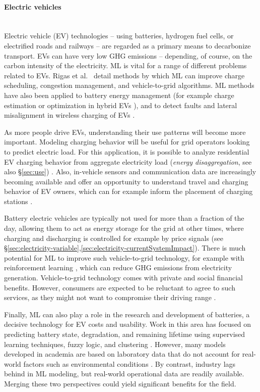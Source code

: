 \documentclass[11pt]{report}
\newcommand{\Gap}{\texorpdfstring{\hfill}{}}
\newcommand{\Rec}{\texorpdfstring{{\small\emph{\color{blue}{\fbox{High Leverage}}}}}{}}
\begin{document}
\paragraph*{Electric vehicles}\Gap\textbf{\Rec}\mbox{}\\\label{sec:transport-evs}Electric vehicle (EV) technologies -- using batteries, hydrogen fuel cells, or electrified roads and railways -- are regarded as a primary means to decarbonize transport. EVs can have very low GHG emissions -- depending, of course, on the carbon intensity of the electricity. ML is vital for a range of different problems related to EVs. Rigas et al.~\cite{7000557} detail methods by which ML can improve charge scheduling, congestion management, and vehicle-to-grid algorithms. ML methods have also been applied to battery energy management (for example charge estimation \cite{HANSEN2005351} or optimization in hybrid EVs \cite{en11030476}), and to detect faults and lateral misalignment in wireless charging of EVs \cite{8096493}. 

As more people drive EVs, understanding their use patterns will become more important. Modeling charging behavior will be useful for grid operators looking to predict electric load. For this application, it is possible to analyze residential EV charging behavior from aggregate electricity load (\emph{energy disaggregation}, see also \S\ref{sec:use}) \cite{WANG20192611}. Also, in-vehicle sensors and communication data are increasingly becoming available and offer an opportunity to understand travel and charging behavior of EV owners, which can for example inform the placement of charging stations \cite{TAO2018735}. 

Battery electric vehicles are typically not used for more than a fraction of the day, allowing them to act as energy storage for the grid 
at other times, where charging and discharging is controlled for example by price signals \cite{doi:10.1002/wene.56} (see \S\ref{sec:electricity-variable},\ref{sec:electricity-currentSystemImpact}). There is much potential for ML to improve such vehicle-to-grid technology, for example with reinforcement learning \cite{VAZQUEZCANTELI20191072}, which can reduce GHG emissions from electricity generation. Vehicle-to-grid technology comes with private and social financial benefits. However, consumers are expected to be reluctant to agree to such services, as they might not want to compromise their driving range \cite{HIDRUE201567}. 

Finally, ML can also play a role in the research and development of batteries, a decisive technology for EV costs and usability. 
Work in this area has focused on predicting battery state, degradation, and remaining lifetime using supervised learning techniques, fuzzy logic, and clustering \cite{wu2016review, waag2014critical, si2011remaining, severson2019data, ellis2018new, hu2016advanced, kauwe2019data, buteau2019}.
However, many models developed in academia are based on laboratory data that do not account for real-world factors such as environmental conditions \cite{wu2016review, waag2014critical, si2011remaining}. By contrast, industry lags behind in ML modeling, but real-world operational data are readily available. Merging these two perspectives could yield significant benefits for the field.
\end{document}
